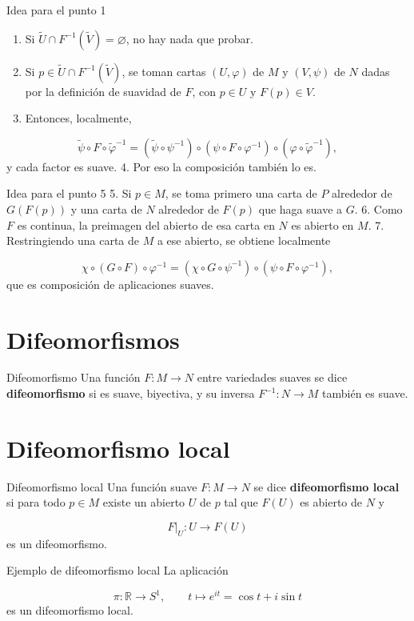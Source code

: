 \begin{bookproof}{Idea para el punto 1}
\begin{enumerate}
\item Si $\widetilde{U}\cap F^{-1}(\widetilde{V})=\varnothing$, no hay nada que probar.
\item Si $p\in \widetilde{U}\cap F^{-1}(\widetilde{V})$, se toman cartas $(U,\varphi)$ de $M$ y $(V,\psi)$ de $N$ dadas por la definición de suavidad de $F$, con $p\in U$ y $F(p)\in V$.
\item Entonces, localmente,
\end{enumerate}
\[
\widetilde{\psi}\circ F\circ\widetilde{\varphi}^{-1}=(\widetilde{\psi}\circ\psi^{-1})\circ(\psi\circ F\circ\varphi^{-1})\circ(\varphi\circ\widetilde{\varphi}^{-1}),
\]
y cada factor es suave. 4. Por eso la composición también lo es.

\bookqed
\end{bookproof}
\begin{bookproof}{Idea para el punto 5}
5. Si $p\in M$, se toma primero una carta de $P$ alrededor de $G(F(p))$ y una carta de $N$ alrededor de $F(p)$ que haga suave a $G$. 6. Como $F$ es continua, la preimagen del abierto de esa carta en $N$ es abierto en $M$. 7. Restringiendo una carta de $M$ a ese abierto, se obtiene localmente

\[
\chi\circ(G\circ F)\circ\varphi^{-1}=(\chi\circ G\circ\psi^{-1})\circ(\psi\circ F\circ\varphi^{-1}),
\]
que es composición de aplicaciones suaves.

\bookqed
\end{bookproof}
\section{Difeomorfismos}
\begin{bookdefinition}{Difeomorfismo}
Una función $F:M\to N$ entre variedades suaves se dice \textbf{difeomorfismo} si es suave, biyectiva, y su inversa $F^{-1}:N\to M$ también es suave.

\end{bookdefinition}
\label{blk:069888}
\section{Difeomorfismo local}
\begin{bookdefinition}{Difeomorfismo local}
Una función suave $F:M\to N$ se dice \textbf{difeomorfismo local} si para todo $p\in M$ existe un abierto $U$ de $p$ tal que $F(U)$ es abierto de $N$ y

\[
F|_U:U\to F(U)
\]
es un difeomorfismo.

\end{bookdefinition}
\begin{bookexample}{Ejemplo de difeomorfismo local}
La aplicación

\[
\pi:\mathbb{R}\to S^1,\qquad t\mapsto e^{it}=\cos t+i\sin t
\]
es un difeomorfismo local.

\end{bookexample}
